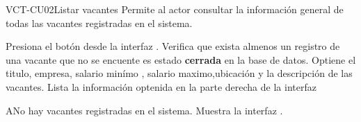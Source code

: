 \begin{UseCase}[]{VCT-CU02}{Listar vacantes}{
	Permite al actor consultar la información general de todas las vacantes registradas en el sistema.
	}
\end{UseCase}

\begin{UCtrayectoria}
	\UCpaso [\UCactor] Presiona el botón  desde la interfaz .
    \UCpaso [\UCsist] Verifica que exista almenos un registro de una vacante que no se encuente es estado \textbf{cerrada} en la base de datos.
	\UCpaso [\UCsist] Optiene el titulo, empresa, salario minímo
	, salario maximo,ubicación y la descripción  de las vacantes.
	\UCpaso [\UCsist] Lista la información optenida en la parte derecha de la interfaz 
\end{UCtrayectoria}

\begin{UCtrayectoriaA}{A}{No hay vacantes registradas en el sistema.}
	\UCpaso [\UCsist] Muestra la interfaz .
\end{UCtrayectoriaA}

